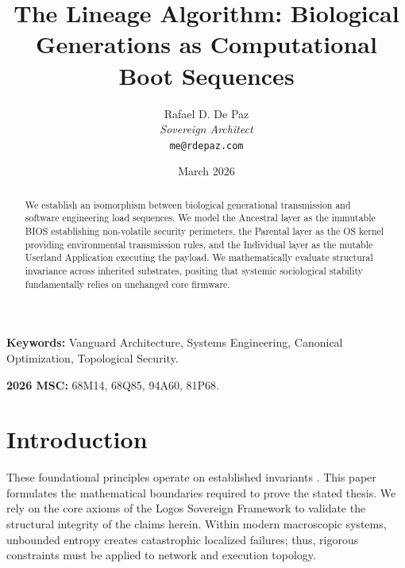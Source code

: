 \documentclass[12pt, a4paper]{article}
\theoremstyle{plain}
\theoremstyle{definition}
\theoremstyle{remark}
\begin{document}
\title{
  \textbf{The Lineage Algorithm: Biological Generations as Computational Boot Sequences}
}
\author{
  Rafael D. De Paz \\
  \textit{Sovereign Architect} \\
  \texttt{me@rdepaz.com}
}
\date{March 2026}
\maketitle

\begin{abstract}
We establish an isomorphism between biological generational transmission and software engineering load sequences. We model the Ancestral layer as the immutable BIOS establishing non-volatile security perimeters, the Parental layer as the OS kernel providing environmental transmission rules, and the Individual layer as the mutable Userland Application executing the payload. We mathematically evaluate structural invariance across inherited substrates, positing that systemic sociological stability fundamentally relies on unchanged core firmware.
\end{abstract}

\vspace{1em}
\noindent\textbf{Keywords:} Vanguard Architecture, Systems Engineering, Canonical Optimization, Topological Security.

\vspace{0.5em}
\noindent\textbf{2026 MSC:} 68M14, 68Q85, 94A60, 81P68.

\section{Introduction}
These foundational principles operate on established invariants \cite{kinney2006trusted,lampson1992authentication}.\label{sec:intro}
This paper formulates the mathematical boundaries required to prove the stated thesis. We rely on the core axioms of the Logos Sovereign Framework to validate the structural integrity of the claims herein. Within modern macroscopic systems, unbounded entropy creates catastrophic localized failures; thus, rigorous constraints must be applied to network and execution topology.
\end{document}
